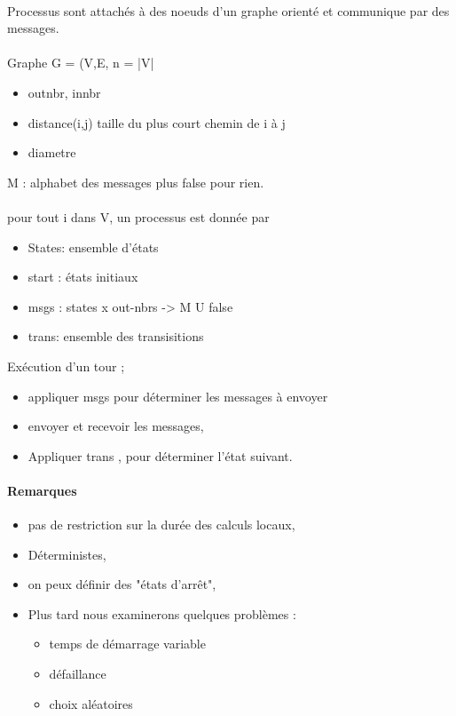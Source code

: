 \documentclass{article}
\begin{document}
\paragraph{}Processus sont attachés à des noeuds d'un graphe orienté  et communique par des messages.\\\\Graphe G  = (V,E, n = |V|
\begin{itemize}
\item outnbr, innbr
\item distance(i,j) taille du plus court chemin de i à j
\item diametre
\end{itemize}
M : alphabet des messages plus false pour rien.\\\\ pour tout i dans V, un processus est donnée par
\begin{itemize}
\item States: ensemble d'états
\item start : états initiaux
\item msgs : states x out-nbrs -> M U {false}
\item trans: ensemble des transisitions
\end{itemize}
Exécution d'un tour ; 
\begin{itemize}
\item appliquer msgs pour déterminer les messages à envoyer
\item envoyer et recevoir les messages, 
\item Appliquer trans , pour déterminer l'état suivant.
\end{itemize}

\paragraph{Remarques}
\begin{itemize}
\item pas de restriction sur la durée des calculs locaux,
\item Déterministes,
\item on peux définir des "états d’arrêt",
\item Plus tard nous examinerons quelques problèmes : 
\begin{itemize}
\item temps de démarrage variable
\item défaillance
\item choix aléatoires
\end{itemize}
\end{itemize}
\end{document}
